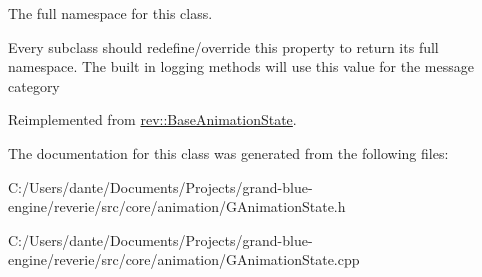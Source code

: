 The full namespace for this class. 

Every subclass should redefine/override this property to return its full namespace. The built in logging methods will use this value for the message category 

Reimplemented from \mbox{\hyperlink{classrev_1_1_base_animation_state_a97dd6a934ca133d2024b1db68dd3316d}{rev\+::\+Base\+Animation\+State}}.



The documentation for this class was generated from the following files\+:\begin{DoxyCompactItemize}
\item 
C\+:/\+Users/dante/\+Documents/\+Projects/grand-\/blue-\/engine/reverie/src/core/animation/G\+Animation\+State.\+h\item 
C\+:/\+Users/dante/\+Documents/\+Projects/grand-\/blue-\/engine/reverie/src/core/animation/G\+Animation\+State.\+cpp\end{DoxyCompactItemize}
